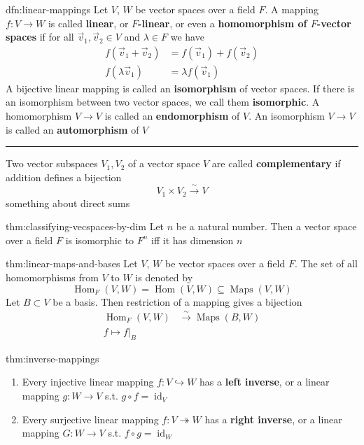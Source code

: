 \documentclass[landscape, 8pt]{extarticle}
\DeclareMathOperator{\Maps}{Maps}
\DeclareMathOperator{\Hom}{Hom}
\DeclareMathOperator{\id}{id}
\begin{document}
\begin{multicols}{3}
\begin{dfn}{dfn:linear-mappings}{}
    Let $V$, $W$ be vector spaces over a field $F$. A mapping $f : V \to W$ is called \textbf{linear}, or \textbf{$F$-linear}, or even a \textbf{homomorphism of $F$-vector spaces} if for all $\vec{v}_{1},\vec{v}_{2}\in V$ and $\lambda \in F$ we have
    \begin{align*}
        f(\vec{v}_{1} + \vec{v}_{2}) &= f(\vec{v}_{1}) + f(\vec{v}_{2})\\
        f(\lambda \vec{v}_{1}) &= \lambda f(\vec{v}_{1})
    \end{align*}
    A bijective linear mapping is called an \textbf{isomorphism} of vector spaces. If there is an isomorphism between two vector spaces, we call them \textbf{isomorphic}. A homomorphism $V\to V$ is called an \textbf{endomorphism} of $V$. An isomorphism $V\to V$ is called an \textbf{automorphism} of $V$

    \noindent\rule{\textwidth}{0.2pt}
    Two vector subspaces $V_{1}, V_{2}$ of a vector space $V$ are called \textbf{complementary} if addition defines a bijection
    \[V_{1} \times V_{2} \xrightarrow{\sim} V\]
    something about direct sums
\end{dfn}

\vspace{-5pt}
\begin{thm}{thm:classifying-vecspaces-by-dim}{}
    Let $n$ be a natural number. Then a vector space over a field $F$ is isomorphic to $F^{n}$ iff it has dimension $n$
\end{thm}

\vspace{-5pt}
\begin{thm}{thm:linear-maps-and-bases}{}
    Let $V$, $W$ be vector spaces over a field $F$. The set of all homomorphisms from $V$ to $W$ is denoted by
    \[\Hom_{F}(V,W) = \Hom(V,W)\subseteq \Maps(V,W)\]
    Let $B \subset V$ be a basis. Then restriction of a mapping gives a bijection
    \begin{align*}
        \Hom_{F}(V, W) &\xrightarrow{\sim} \Maps(B, W) \\
        f \mapsto f \lvert_{B}
    \end{align*}
\end{thm}

\vspace{-5pt}
\begin{thm}{thm:inverse-mappings}{}
    \begin{enumerate}[leftmargin=*]
        \setlength\itemsep{0em}
        \item Every injective linear mapping $f : V \hookrightarrow W$ has a \textbf{left inverse}, or a linear mapping $g : W \to V$ s.t. $g \circ f = \id_{V}$
        \item Every surjective linear mapping $f : V \twoheadrightarrow W$ has a \textbf{right inverse}, or a linear mapping $G : W \to V$ s.t. $f \circ g = \id_{W}$
    \end{enumerate}
\end{thm}


\end{multicols}
\end{document}
